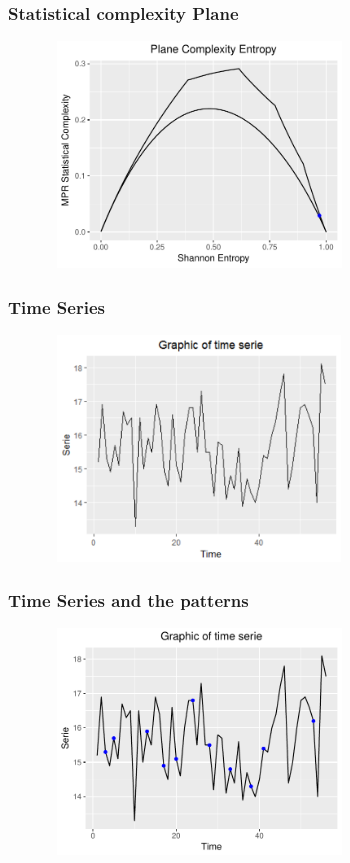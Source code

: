 \documentclass[10pt, compress]{beamer}
\begin{document}
\begin{frame}[fragile]
\frametitle{Statistical complexity Plane}

\begin{figure}
  \centering
   \includegraphics[width=8cm,height=6cm]{Rplot3.pdf}
\end{figure}
\end{frame}

\begin{frame}[fragile]
\frametitle{Time Series}

\begin{figure}
  \centering
   \includegraphics[width=8cm,height=6cm]{Rplot.pdf}
\end{figure}
\end{frame}

\begin{frame}[fragile]
\frametitle{Time Series and the patterns}

\begin{figure}
  \centering
   \includegraphics[width=8cm,height=6cm]{Rplot04.pdf}
\end{figure}
\end{frame}
\end{document}

